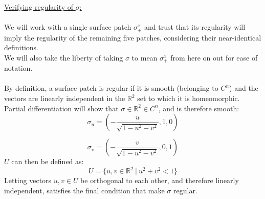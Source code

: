 \documentclass[12pt]{article}
\begin{document}
\clearpage

\underline{Verifying regularity of $\sigma$:}\\\\
\indent
We will work with a single surface patch $\sigma^x_+$ and trust that its regularity will imply the regularity of the remaining five patches, considering their near-identical definitions.\\
\indent
We will also take the liberty of taking $\sigma$ to mean $\sigma^x_+$  from here on out for ease of notation.\\\\
\indent
By definition, a surface patch is regular if it is smooth (belonging to $C^n$) and the vectors are linearly independent in the $\mathbb{R}^2$ set to which it is homeomorphic.\\
\indent
Partial differentiation will show that  $\sigma \in \mathbb{R}^2 \in C^n$, and is therefore smooth:
$$
\sigma_u = \left(-\frac{u}{\sqrt{1-u^2-v^2}}, 1 ,0 \right)
$$

$$
\sigma_v = \left(-\frac{v}{\sqrt{1-u^2-v^2}}, 0 ,1 \right)
$$
\indent
$U$ can then be defined as:
$$
U = \lbrace u,v \in \mathbb{R}^2 \ | \ u^2 + v^2 < 1 \rbrace
$$
\indent
Letting vectors $u, v \in U$ be orthogonal to each other, and therefore linearly independent, satisfies the final condition that make $\sigma$ regular.
\end{document}
